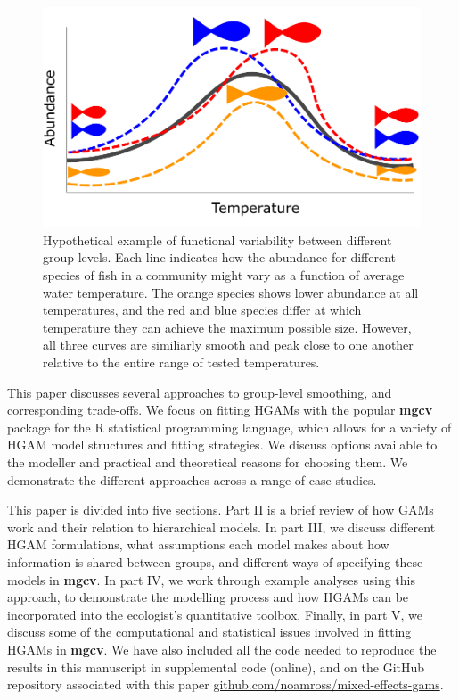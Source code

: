 \documentclass[12pt]{article}
\begin{document}
\begin{figure}

{\centering \includegraphics[width=.6\linewidth]{../figures/temp_growth_example} 

}

\caption{\label{fig:fish_size}Hypothetical example of functional variability between different group levels. Each line indicates how the abundance for different species of fish in a community might vary as a function of average water temperature. The orange species shows lower abundance at all temperatures, and the red and blue species differ at which temperature they can achieve the maximum possible size. However, all three curves are similiarly smooth and peak close to one another relative to the entire range of tested temperatures.}\label{fig:fish_size}
\end{figure}

This paper discusses several approaches to group-level smoothing, and
corresponding trade-offs. We focus on fitting HGAMs with the popular
\textbf{mgcv} package for the R statistical programming language, which
allows for a variety of HGAM model structures and fitting strategies. We
discuss options available to the modeller and practical and theoretical
reasons for choosing them. We demonstrate the different approaches
across a range of case studies.

This paper is divided into five sections. Part II is a brief review of
how GAMs work and their relation to hierarchical models. In part III, we
discuss different HGAM formulations, what assumptions each model makes
about how information is shared between groups, and different ways of
specifying these models in \textbf{mgcv}. In part IV, we work through
example analyses using this approach, to demonstrate the modelling
process and how HGAMs can be incorporated into the ecologist's
quantitative toolbox. Finally, in part V, we discuss some of the
computational and statistical issues involved in fitting HGAMs in
\textbf{mgcv}. We have also included all the code needed to reproduce
the results in this manuscript in supplemental code (online), and on the
GitHub repository associated with this paper
\href{http://www.github.com/noamross/mixed-effect-gams}{github.com/noamross/mixed-effects-gams}.
\end{document}
